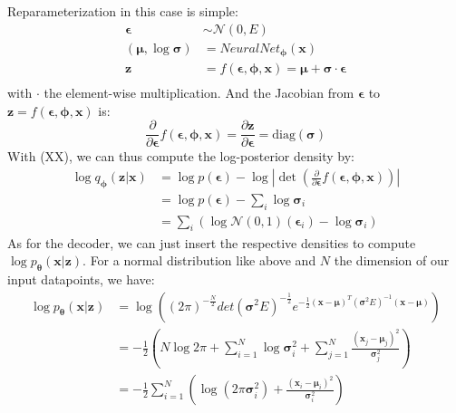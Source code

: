 \documentclass[12pt]{report}
\theoremstyle{definition}
\begin{document}
Reparameterization in this case is simple:
\begin{equation}
\begin{split}
\pmb{\epsilon} & \sim \mathcal{N}(0, E) \\
(\pmb{\mu}, \log \pmb{\sigma}) & = NeuralNet_{\pmb{\phi}}(\mathbf{x}) \\
\mathbf{z} & = f(\pmb{\epsilon}, \pmb{\phi}, \pmb{x}) = \pmb{\mu} + \pmb{\sigma} \cdot \pmb{\epsilon}\\
\end{split}
\end{equation}
with $\cdot$ the element-wise multiplication. And the Jacobian from $\pmb{\epsilon}$ to $\mathbf{z} = f(\pmb{\epsilon}, \pmb{\phi}, \pmb{x})$ is:
\begin{equation}
\frac{\partial}{\partial \pmb{\epsilon}}f(\pmb{\epsilon}, \pmb{\phi}, \mathbf{x}) = \frac{\partial \mathbf{z}}{\partial \pmb{\epsilon}} = \mathrm{diag}(\pmb{\sigma})
\end{equation}
With (XX), we can thus compute the log-posterior density by:
\begin{equation}
\begin{split}
\log q_{\pmb{\phi}}(\mathbf{z}|\mathbf{x}) & = \log p(\pmb{\epsilon}) - \log \left|\det \left(\frac{\partial}{\partial \pmb{\epsilon}}f(\pmb{\epsilon}, \pmb{\phi}, \mathbf{x})\right)\right| \\
& = \log p(\pmb{\epsilon}) - \sum_i \log \pmb{\sigma}_i \\
& = \sum_i \left(\log \mathcal{N}(0, 1)(\pmb{\epsilon}_i) - \log \pmb{\sigma}_i \right)
\end{split}
\end{equation}
As for the decoder, we can just insert the respective densities to compute $\log p_{\pmb{\theta}}(\mathbf{x}|\mathbf{z})$. For a normal distribution like above and $N$ the dimension of our input datapoints, we have:
\begin{equation}
\begin{split}
\log p_{\pmb{\theta}}(\mathbf{x}|\mathbf{z}) 
& = \log \left( (2\pi)^{-\frac{N}{2}}det(\pmb{\sigma}^2 E)^{-\frac{1}{2}} e^{-\frac{1}{2}(\mathbf{x}-\pmb{\mu})^T(\pmb{\sigma}^2 E)^{-1}(\mathbf{x}-\pmb{\mu})}\right) \\
& = - \frac{1}{2} \left( N \log2\pi + \sum_{i=1}^N \log\pmb{\sigma}_i^2 + \sum_{j=1}^N \frac{(\mathbf{x}_j - \pmb{\mu}_j)^2}{\pmb{\sigma}_j^2} \right) \\
& = - \frac{1}{2} \sum_{i=1}^N \left(\log(2\pi\pmb{\sigma}_i^2) + \frac{(\mathbf{x}_i - \pmb{\mu}_i)^2}{\pmb{\sigma}_i^2} \right) \\
\end{split}
\end{equation}
\end{document}
